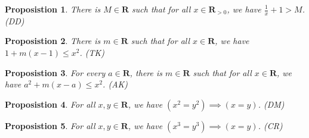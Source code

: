 \documentclass[12pt,fleqn,answers]{exam}
\newcommand{\reals}{\mathbf{R}}
\newtheorem{prop}{Proposistion}
\begin{document}
    \begin{prop}
      There is $M \in \reals$ such that for all $x \in \reals_{>0}$,
     we have $\frac{1}{x} + 1 > M$. \hfill (DD) 
    \end{prop}

     \begin{prop}
      There is $m \in \reals$ such that for all $x \in \reals$, we 
     have $1 + m(x-1) \leq x^2$. \hfill (TK)
     \end{prop}

     \begin{prop} For every $a \in \reals$, there is $m \in \reals$ such 
     that for all $x \in \reals$, we have $a^2 + m(x-a) \leq x^2$. \hfill (AK)
     \end{prop}

     \begin{prop} For all $x,y \in \reals$, we have $(x^2 = y^2) \implies (x=y)$. 
     \hfill (DM)
     \end{prop} 

    \begin{prop} For all $x,y \in \reals$, we have $(x^3 = y^3) \implies (x=y)$. 
    \hfill (CR) 
    \end{prop}
\end{document}
